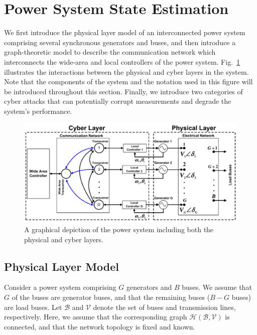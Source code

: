 
\section{Power System State Estimation}\label{sec:application}
We first introduce the physical layer model of an interconnected power system comprising several synchronous generators and buses, and then introduce a graph-theoretic model to describe the communication network which interconnects the wide-area and local controllers of the power system. Fig.~\ref{ps} illustrates the interactions between the physical and cyber layers in the system. Note that the components of the system and the notation used
in this figure will be introduced throughout this section. Finally, we introduce two categories of cyber attacks that can potentially corrupt measurements and degrade the system's performance.

\begin{figure}[t]
\begin{center}
\includegraphics[width=6.5in]{chapters/se_nonlinear/figures/ps}\caption{A graphical depiction of the power system including both the physical and cyber layers.}\label{ps}
\end{center}
\end{figure}



\subsection{Physical Layer Model}
Consider a power system comprising $G$ generators and $B$ buses. We assume that $G$ of the buses are generator buses, and that the remaining buses ($B-G$ buses) are load buses. Let $\mathcal{B}$ and $\mathcal{V}$ denote the set of buses and transmission lines, respectively. Here, we assume that the corresponding graph $\mathcal{H}(\mathcal{B},\mathcal{V})$ is connected, and that the network topology is fixed and known.

